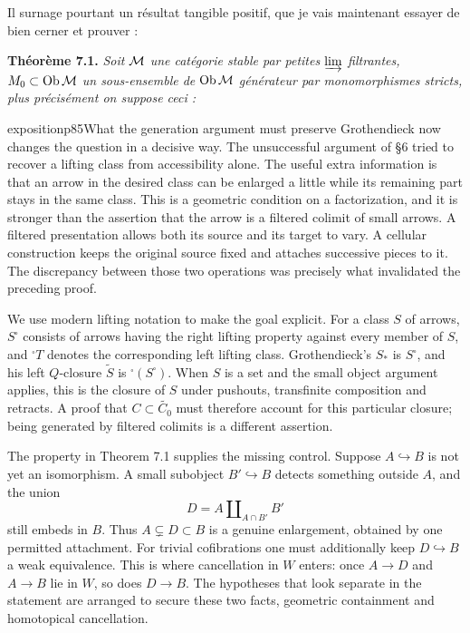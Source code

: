 Il surnage pourtant un résultat tangible positif, que je vais maintenant essayer de bien cerner et prouver :

\textbf{Théorème 7.1.} \textit{Soit $\mathcal{M}$ une catégorie stable par petites $\varinjlim$ filtrantes, $M_0 \subset \mathrm{Ob}\,\mathcal{M}$ un sous-ensemble de} $\mathrm{Ob}\,\mathcal{M}$ \textit{générateur par monomorphismes stricts, plus précisément on suppose ceci :}

\begin{dcomment}{exposition}{p85}{What the generation argument must preserve}
Grothendieck now changes the question in a decisive way. The unsuccessful argument of \S6 tried to recover a lifting class from accessibility alone. The useful extra information is that an arrow in the desired class can be enlarged a little while its remaining part stays in the same class. This is a geometric condition on a factorization, and it is stronger than the assertion that the arrow is a filtered colimit of small arrows. A filtered presentation allows both its source and its target to vary. A cellular construction keeps the original source fixed and attaches successive pieces to it. The discrepancy between those two operations was precisely what invalidated the preceding proof.

We use modern lifting notation to make the goal explicit. For a class $S$ of arrows, $S^{\square}$ consists of arrows having the right lifting property against every member of $S$, and ${}^{\square}T$ denotes the corresponding left lifting class. Grothendieck's $S_*$ is $S^{\square}$, and his left $Q$-closure $\widetilde S$ is ${}^{\square}(S^{\square})$. When $S$ is a set and the small object argument applies, this is the closure of $S$ under pushouts, transfinite composition and retracts. A proof that $C\subset\widetilde{C_0}$ must therefore account for this particular closure; being generated by filtered colimits is a different assertion.

The property in Theorem 7.1 supplies the missing control. Suppose $A\hookrightarrow B$ is not yet an isomorphism. A small subobject $B'\hookrightarrow B$ detects something outside $A$, and the union
\[
 D=A\amalg_{A\cap B'}B'
\]
still embeds in $B$. Thus $A\subsetneq D\subset B$ is a genuine enlargement, obtained by one permitted attachment. For trivial cofibrations one must additionally keep $D\hookrightarrow B$ a weak equivalence. This is where cancellation in $W$ enters: once $A\to D$ and $A\to B$ lie in $W$, so does $D\to B$. The hypotheses that look separate in the statement are arranged to secure these two facts, geometric containment and homotopical cancellation.


\end{dcomment}
